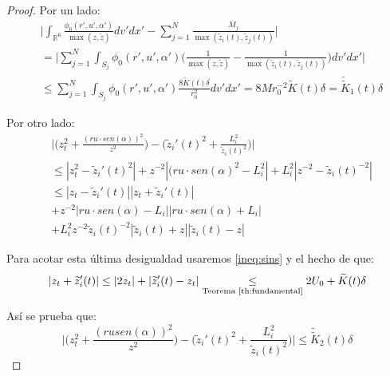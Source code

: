 \documentclass[a4paper,10pt]{scrartcl}
\theoremstyle{definition}
\newcommand{\ktilde}{\widetilde{K}}
\newcommand{\dtilde}[1]{\widetilde{\widetilde{#1}}}
\numberwithin{equation}{section}
\begin{document}
\begin{proof}
Por un lado:
\begin{align*}
 &\Bigg|\int_{\mathbb{R}^6}\frac{\phi_0(r',u',\alpha')}{\max(z,\widetilde{z})} dv' dx' - \sum_{j=1}^N \frac{M_j}{\max(\widetilde{z}_i(t), \widetilde{z}_j(t))} \Bigg| \\
 &= \Bigg|\sum_{j=1}^N \int_{S_j}\phi_0(r',u',\alpha') \Bigg(\frac{1}{\max(z,\widetilde{z})} - \frac{1}{\max(\widetilde{z}_i(t), \widetilde{z}_j(t))} \Bigg)dv' dx'\Bigg| \\
 &\le \sum_{j=1}^N \int_{S_j} \phi_0(r',u',\alpha') \frac{8\ktilde(t)\delta}{r_0^2} dv' dx' = 8Mr_0^{-2} \ktilde(t) \delta = \dtilde{K}_1(t) \delta
\end{align*}

Por otro lado:
\begin{align*}
&\Bigg|\Bigg(z_t^2 + \frac{(ru \cdot sen(\alpha))^2}{z^2}\Bigg) - \Bigg(\widetilde{z}_i'(t)^2 + \frac{L_i^2}{\widetilde{z}_i(t)^2} \Bigg)\Bigg| \\
&\le |z_t^2 - \widetilde{z}_i'(t)^2| + z^{-2}|(ru \cdot sen(\alpha)^2 - L_i^2| + L_i^2|z^{-2} - \widetilde{z}_i(t)^{-2}| \\
&\le |z_t - \widetilde{z}_i'(t)||z_t +\widetilde{z}_i'(t)| \\
&+ z^{-2}|ru \cdot sen(\alpha) - L_i||ru \cdot sen(\alpha) + L_i| \\
&+ L_i^2 z^{-2} \widetilde{z}_i(t)^{-2} |\widetilde{z}_i(t) + z||\widetilde{z}_i(t) - z|
\end{align*}

Para acotar esta última desigualdad usaremos \eqref{ineq:sins} y el hecho de que:
\[
|z_t + \widetilde{z}_i'(t)| \le |2z_t| + |\widetilde{z}_i'(t) - z_t| \underset{\textrm{Teorema \eqref{th:fundamental}}}{\le} 2U_0 + \ktilde(t) \delta
\]

Así se prueba que: 
\[
 \Bigg|\Bigg(z_t^2 + \frac{(ru sen(\alpha))^2}{z^2}\Bigg) - \Bigg(\widetilde{z}_i'(t)^2 + \frac{L_i^2}{\widetilde{z}_i(t)^2} \Bigg)\Bigg| \le \dtilde{K}_2(t) \delta
\]


\end{proof}
\end{document}

